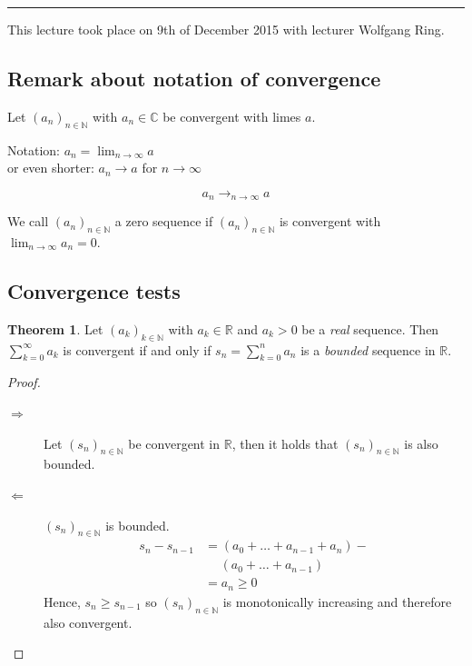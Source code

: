 \documentclass[a4paper,landscape,twocolumn]{article}
\theoremstyle{definition}
\newtheorem{theorem}{Theorem}
\newcommand\seq[1]{{\left(#1\right)}_{n \in \mathbb N}}
\newcommand\meta[3]{\hrule{} This #1 took place on #2 with lecturer #3.\par}
\begin{document}
\meta{lecture}{9th of December 2015}{Wolfgang Ring}

\subsection{Remark about notation of convergence}

Let $\seq{a_n}$ with $a_n \in \mathbb C$ be convergent with limes $a$.

Notation: $a_n = \lim_{n\to\infty} a$ \\
or even shorter: $a_n \to a$ for $n \to \infty$

\[ a_n \to_{n\to\infty} a \]

We call $\seq{a_n}$ a zero sequence if $\seq{a_n}$ is convergent with $\lim_{n\to\infty} a_n = 0$.

\subsection{Convergence tests}
%
\begin{theorem}
  Let $\left(a_k\right)_{k\in\mathbb N}$ with $a_k \in \mathbb R$ and $a_k > 0$
  be a \emph{real} sequence. Then $\sum_{k=0}^\infty a_k$ is convergent if and only if
  $s_n = \sum_{k=0}^n a_n$ is a \emph{bounded} sequence in $\mathbb R$.
\end{theorem}
\begin{proof}
  \begin{description}
    \item[$\Rightarrow$]
      Let $\seq{s_n}$ be convergent in $\mathbb R$, then it holds that
      $\seq{s_n}$ is also bounded.
    \item[$\Leftarrow$]
      $\seq{s_n}$ is bounded.
      \begin{align*}
        s_n - s_{n-1} &= (a_0 + \ldots + a_{n-1} + a_n) - \\
                      &\hspace{15pt} (a_0 + \ldots + a_{n-1}) \\
                      &= a_n \geq 0
      \end{align*}
      Hence, $s_n \geq s_{n-1}$ so $\seq{s_n}$ is monotonically increasing and therefore also convergent.
  \end{description}
\end{proof}
\end{document}
